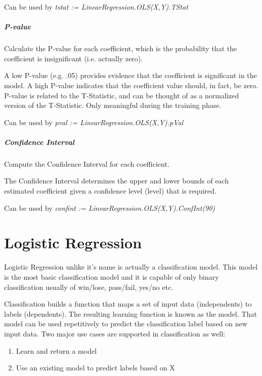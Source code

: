 Can be used by \textit{tstat := LinearRegression.OLS(X,Y).TStat}

\paragraph{P-value}

Calculate the P-value for each coefficient, which is the probability that the coefficient is insignificant (i.e. actually zero).

A low P-value (e.g. .05) provides evidence that the coefficient is significant in the model. A high P-value indicates that the coefficient value should, in fact, be zero. P-value is related to the T-Statistic, and can be thought of as a normalized version of the T-Statistic. Only meaningful during the training phase.

Can be used by \textit{pval := LinearRegression.OLS(X,Y).pVal}

\paragraph{Confidence Interval}

Compute the Confidence Interval for each coefficient.

The Confidence Interval determines the upper and lower bounds of each estimated coefficient given a confidence level (level) that is required.

Can be used by \textit{confint := LinearRegression.OLS(X,Y).ConfInt(90)}

\chapter{Logistic Regression}\label{supe:logreg}

Logistic Regression unlike it's name is actually a classification model. This model is the most basic classification model and it is capable of only binary classification usually of win/lose, pass/fail, yes/no etc.

Classification builds a function that maps a set of input data (independents) to labels (dependents). The resulting learning function is known as the model. That model can be used repetitively to predict the classification label based on new input data. Two major use cases are supported in classification as well:

\begin{enumerate}
    \item Learn and return a model
    \item Use an existing model to predict labels based on X
\end{enumerate}


